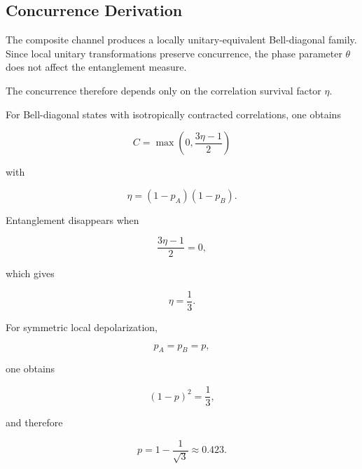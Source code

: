\subsection{Concurrence Derivation}

The composite channel produces a locally unitary-equivalent Bell-diagonal family. Since local unitary transformations preserve concurrence, the phase parameter \( \theta \) does not affect the entanglement measure.

\medskip

The concurrence therefore depends only on the correlation survival factor \( \eta \).

\medskip

For Bell-diagonal states with isotropically contracted correlations, one obtains

\begin{equation}
\boxed{
C
=
\max
\left(
0,
\frac{3\eta-1}{2}
\right)
}
\label{eq:d5_final_concurrence}
\end{equation}

with

\[
\eta=(1-p_A)(1-p_B).
\]

\medskip

Entanglement disappears when

\begin{equation}
\frac{3\eta-1}{2}=0,
\end{equation}

which gives

\begin{equation}
\boxed{
\eta=\frac13
}.
\label{eq:d5_entanglement_threshold}
\end{equation}

\medskip

For symmetric local depolarization,

\[
p_A=p_B=p,
\]

one obtains

\begin{equation}
(1-p)^2
=
\frac13,
\end{equation}

and therefore

\begin{equation}
\boxed{
p
=
1-\frac1{\sqrt3}
\approx
0.423
}.
\end{equation}

\medskip



